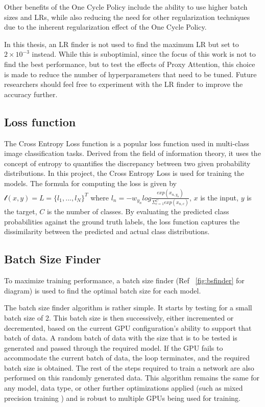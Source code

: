 \documentclass[a4paper,11pt,openright]{book}
\begin{document}
Other benefits of the One Cycle Policy include the ability to use higher batch sizes and LRs, while also reducing the need for other regularization techniques due to the inherent regularization effect of the One Cycle Policy.

In this thesis, an LR finder is not used to find the maximum LR but set to $2\times 10^{-3}$ instead. While this is suboptimial, since the focus of this work is not to find the best performance, but to test the effects of Proxy Attention, this choice is made to reduce the number of hyperparameters that need to be tuned. Future researchers should feel free to experiment with the LR finder to improve the accuracy further.

\subsection{Loss function}
The Cross Entropy Loss function is a popular loss function used in multi-class image classification tasks. Derived from the field of information theory, it uses the concept of entropy to quantifies the discrepancy between two given probability distributions. In this project, the Cross Entropy Loss is used for training the models. The formula for computing the loss is given by $\mathscr{l}(x,y) = L = \{l_{1}, ..., l_{N}\}^{T}$ where $l_{n} = -w_{y_{n}}log \frac{exp(x_{n, y_{n}})}{\Sigma_{c=1}^{C}exp(x_{n,c})}$, $x$ is the input, $y$ is the target, $C$ is the number of classes. By evaluating the predicted class probabilities against the ground truth labels, the loss function captures the dissimilarity between the predicted and actual class distributions. 

\subsection{Batch Size Finder}
To maximize training performance, a batch size finder (Ref ~\ref{fig:bsfinder} for diagram) is used to find the optimal batch size for each model.

The batch size finder algorithm is rather simple. It starts by testing for a small batch size of 2. This batch size is then successively, either incremented or decremented, based on the current GPU configuration's ability to support that batch of data.
A random batch of data with the size that is to be tested is generated and passed through the required model. If the GPU fails to accommodate the current batch of data, the loop terminates, and the required batch size is obtained. The rest of the steps required to train a network are also performed on this randomly generated data.
This algorithm remains the same for any model, data type, or other further optimizations applied (such as mixed precision training \cite{micikeviciusMixedPrecisionTraining2017}) and is robust to multiple GPUs being used for training.
\end{document}
